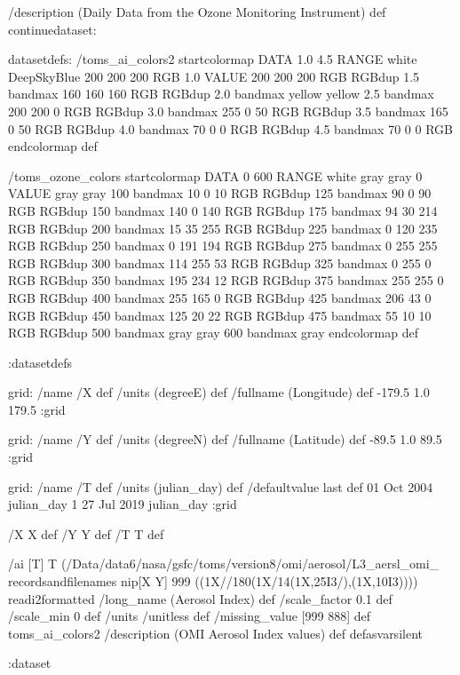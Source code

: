 \begin{ingrid}
/description (Daily Data from the Ozone Monitoring Instrument) def
continuedataset:

datasetdefs:
/toms_ai_colors2 {
startcolormap DATA
1.0 4.5 RANGE
white DeepSkyBlue
200 200 200 RGB
1.0 VALUE
200 200 200 RGB RGBdup
1.5 bandmax
160 160 160 RGB RGBdup
2.0 bandmax
yellow yellow
2.5 bandmax
200 200 0 RGB RGBdup
3.0 bandmax
255 0 50 RGB RGBdup
3.5 bandmax
165 0 50 RGB RGBdup
4.0 bandmax
70 0 0 RGB RGBdup
4.5 bandmax
70 0 0 RGB endcolormap } def

/toms_ozone_colors {
startcolormap DATA 0 600 RANGE
white gray gray 0 VALUE
gray gray 100 bandmax
10 0 10 RGB RGBdup 125 bandmax
90 0 90 RGB RGBdup 150 bandmax
140 0 140 RGB RGBdup 175 bandmax
94 30 214 RGB RGBdup 200 bandmax
15 35 255 RGB RGBdup 225 bandmax
0 120 235 RGB RGBdup 250 bandmax
0 191 194 RGB RGBdup 275 bandmax
0 255 255 RGB RGBdup 300 bandmax
114 255 53 RGB RGBdup 325 bandmax
0 255 0 RGB RGBdup 350 bandmax
195 234 12 RGB RGBdup 375 bandmax
255 255 0 RGB RGBdup 400 bandmax
255 165 0 RGB RGBdup 425 bandmax
206 43 0 RGB RGBdup 450 bandmax
125 20 22 RGB RGBdup 475 bandmax
55 10 10 RGB RGBdup 500 bandmax
gray gray 600 bandmax
gray
endcolormap } def

:datasetdefs

grid:
/name /X def
/units (degreeE) def
/fullname (Longitude) def
-179.5 1.0 179.5
:grid

grid:
/name /Y def
/units (degreeN) def
/fullname (Latitude) def
-89.5 1.0 89.5 
:grid

grid:
/name /T def
/units (julian_day) def
/defaultvalue { last } def
 01 Oct 2004 julian_day 
1 
27 Jul 2019 julian_day
:grid

/X X def
/Y Y def
/T T def

/ai {
[T]
T
(/Data/data6/nasa/gsfc/toms/version8/omi/aerosol/L3_aersl_omi_%
recordsandfilenames nip[X Y] 999 
((1X//180(1X/14(1X,25I3/),(1X,10I3)))) readi2formatted
/long_name (Aerosol Index) def
/scale_factor 0.1 def
/scale_min 0 def
/units /unitless def
/missing_value [999 888] def
toms_ai_colors2
/description (OMI Aerosol Index values) def
}defasvarsilent


:dataset
\end{ingrid}
